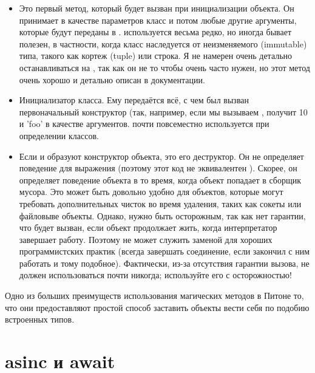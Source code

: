 \begin{itemize}
	\item \pyth{__new__(cls, [...)}
Это первый метод, который будет вызван при инициализации объекта. Он принимает в качестве параметров класс и потом любые другие аргументы, которые будут переданы в .  используется весьма редко, но иногда бывает полезен, в частности, когда класс наследуется от неизменяемого (immutable) типа, такого как кортеж (tuple) или строка. Я не намерен очень детально останавливаться на , так как он не то чтобы очень часто нужен, но этот метод очень хорошо и детально описан в документации.

	\item \pyth{__init__(self, [...)}
Инициализатор класса. Ему передаётся всё, с чем был вызван первоначальный конструктор (так, например, если мы вызываем ,  получит 10 и 'foo' в качестве аргументов.  почти повсеместно используется при определении классов.

	\item {}
Если  и  образуют конструктор объекта,  это его деструктор. Он не определяет поведение для выражения  (поэтому этот код не эквивалентен ). Скорее, он определяет поведение объекта в то время, когда объект попадает в сборщик мусора. Это может быть довольно удобно для объектов, которые могут требовать дополнительных чисток во время удаления, таких как сокеты или файловыве объекты. Однако, нужно быть осторожным, так как нет гарантии, что  будет вызван, если объект продолжает жить, когда интерпретатор завершает работу. Поэтому  не может служить заменой для хороших программистских практик (всегда завершать соединение, если закончил с ним работать и тому подобное). Фактически, из-за отсутствия гарантии вызова,  не должен использоваться почти никогда; используйте его с осторожностью!

\end{itemize}

Одно из больших преимуществ использования магических методов в Питоне то, что они предоставляют простой способ заставить объекты вести себя по подобию встроенных типов. 

\section{asinc и await}

